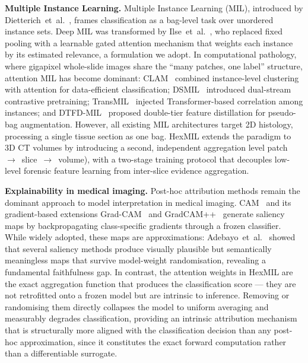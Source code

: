 \documentclass[sigconf, screen, review, anonymous]{acmart}
\begin{document}
\noindent\textbf{Multiple Instance Learning.}
Multiple Instance Learning (MIL), introduced by Dietterich~et~al.~\cite{dietterich1997mil}, frames classification as a bag-level task over unordered instance sets. Deep MIL was transformed by Ilse~et~al.~\cite{ilse2018attention}, who replaced fixed pooling with a learnable gated attention mechanism that weights each instance by its estimated relevance, a formulation we adopt. In computational pathology, where gigapixel whole-slide images share the ``many patches, one label'' structure, attention MIL has become dominant: CLAM~\cite{lu2021data} combined instance-level clustering with attention for data-efficient classification; DSMIL~\cite{li2021dual} introduced dual-stream contrastive pretraining; TransMIL~\cite{shao2021transmil} injected Transformer-based correlation among instances; and DTFD-MIL~\cite{zhang2022dtfd} proposed double-tier feature distillation for pseudo-bag augmentation. However, all existing MIL architectures target 2D histology, processing a single tissue section as one bag. HexMIL extends the paradigm to 3D CT volumes by introducing a second, independent aggregation level  patch~$\to$~slice~$\to$~volume), with a two-stage training protocol that decouples low-level forensic feature learning from inter-slice evidence aggregation.

\noindent\textbf{Explainability in medical imaging.}
Post-hoc attribution methods remain the dominant approach to model interpretation in medical imaging. CAM~\cite{zhou2016learning} and its gradient-based extensions Grad-CAM~\cite{selvaraju2017grad} and GradCAM++~\cite{chattopadhay2018grad} generate saliency maps by backpropagating class-specific gradients through a frozen classifier. While widely adopted, these maps are approximations: Adebayo~et~al.~\cite{adebayo2018sanity} showed that several saliency methods produce visually plausible but semantically meaningless maps that survive model-weight randomisation, revealing a fundamental faithfulness gap. In contrast, the attention weights in HexMIL are the exact aggregation function that produces the classification score --- they are not retrofitted onto a frozen model but are intrinsic to inference. Removing or randomising them directly collapses the model to uniform averaging and measurably degrades classification, providing an intrinsic attribution mechanism that is structurally more aligned with the classification decision than any post-hoc approximation, since it constitutes the exact forward computation rather than a differentiable surrogate.
\end{document}
